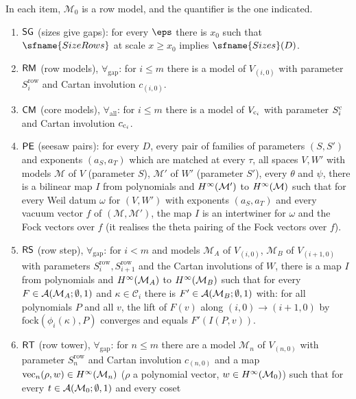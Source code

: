 \begin{definition}\label{pf:fs:statements}
In each item, $\mathcal M_0$ is a row model, and the quantifier is the one indicated.
\begin{enumerate}[label=(\arabic*),leftmargin=*]
\item $\mathsf{SG}$ (sizes give gaps): for every $\eps$ there is $x_0$ such that $\sfname{SizeRows}$ at scale $x\ge x_0$ implies
$\sfname{Sizes}(D)$.
\item $\mathsf{RM}$ (row models), $\forall_{\mathrm{gap}}$: for $i\le m$ there is a model of $V_{(i,0)}$ with parameter
$S^{\mathrm{row}}_i$ and Cartan involution $c_{(i,0)}$.
\item $\mathsf{CM}$ (core models), $\forall_{\mathrm{all}}$: for $i\le m$ there is a model of $V_{\mathrm{c}_i}$ with parameter $S^{\mathrm{c}}_i$
and Cartan involution $c_{\mathrm{c}_i}$.
\item $\mathsf{PE}$ (seesaw pairs): for every $D$, every pair of families of parameters $(S,S')$ and exponents $(a_S,a_T)$ which are
matched at every $\tau$, all spaces $V,W'$ with models $\mathcal M$ of $V$ (parameter $S$), $\mathcal M'$ of $W'$ (parameter $S'$),
every $\theta$ and $\psi$, there is a bilinear map $I$ from polynomials and $H^{\infty}(\mathcal M')$ to $H^{\infty}(\mathcal M)$ such that for
every Weil datum $\omega$ for $(V,W')$ with exponents $(a_S,a_T)$ and every vacuum vector $f$ of $(\mathcal M,\mathcal M')$, the map
$I$ is an intertwiner for $\omega$ and the Fock vectors over $f$ (it realises the theta pairing of the Fock vectors over $f$).
\item $\mathsf{RS}$ (row step), $\forall_{\mathrm{gap}}$: for $i<m$ and models $\mathcal M_A$ of $V_{(i,0)}$, $\mathcal M_B$ of
$V_{(i+1,0)}$ with parameters $S^{\mathrm{row}}_i,S^{\mathrm{row}}_{i+1}$ and the Cartan involutions of $W$, there is a map $I$
from polynomials and $H^{\infty}(\mathcal M_A)$ to $H^{\infty}(\mathcal M_B)$ such that for every $F\in\mathcal A(\mathcal M_A;\emptyset,1)$ and
$\kappa\in\mathcal C_i$ there is $F'\in\mathcal A(\mathcal M_B;\emptyset,1)$ with: for all polynomials $P$ and all $v$, the lift of $F(v)$
along $(i,0)\to(i+1,0)$ by $\mathrm{fock}(\phi_i(\kappa),P)$ converges and equals $F'(I(P,v))$.
\item $\mathsf{RT}$ (row tower), $\forall_{\mathrm{gap}}$: for $n\le m$ there are a model $\mathcal M_n$ of $V_{(n,0)}$ with
parameter $S^{\mathrm{row}}_n$ and Cartan involution $c_{(n,0)}$ and a map $\mathrm{vec}_n(\rho,w)\in H^{\infty}(\mathcal M_n)$
($\rho$ a polynomial vector, $w\in H^{\infty}(\mathcal M_0)$) such that for every $t\in\mathcal A(\mathcal M_0;\emptyset,1)$ and every coset

\end{enumerate}
\end{definition}
